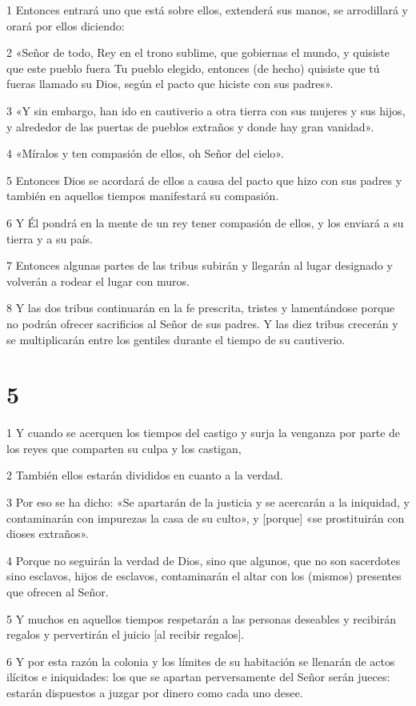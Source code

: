 \par 1 Entonces entrará uno que está sobre ellos, extenderá sus manos, se arrodillará y orará por ellos diciendo:
\par 2 «Señor de todo, Rey en el trono sublime, que gobiernas el mundo, y quisiste que este pueblo fuera Tu pueblo elegido, entonces (de hecho) quisiste que tú fueras llamado su Dios, según el pacto que hiciste con sus padres».
\par 3 «Y sin embargo, han ido en cautiverio a otra tierra con sus mujeres y sus hijos, y alrededor de las puertas de pueblos extraños y donde hay gran vanidad».
\par 4 «Míralos y ten compasión de ellos, oh Señor del cielo».
\par 5 Entonces Dios se acordará de ellos a causa del pacto que hizo con sus padres y también en aquellos tiempos manifestará su compasión.
\par 6 Y Él pondrá en la mente de un rey tener compasión de ellos, y los enviará a su tierra y a su país.
\par 7 Entonces algunas partes de las tribus subirán y llegarán al lugar designado y volverán a rodear el lugar con muros.
\par 8 Y las dos tribus continuarán en la fe prescrita, tristes y lamentándose porque no podrán ofrecer sacrificios al Señor de sus padres. Y las diez tribus crecerán y se multiplicarán entre los gentiles durante el tiempo de su cautiverio.

\chapter{5}

\par 1 Y cuando se acerquen los tiempos del castigo y surja la venganza por parte de los reyes que comparten su culpa y los castigan,
\par 2 También ellos estarán divididos en cuanto a la verdad.
\par 3 Por eso se ha dicho: «Se apartarán de la justicia y se acercarán a la iniquidad, y contaminarán con impurezas la casa de su culto», y [porque] «se prostituirán con dioses extraños».
\par 4 Porque no seguirán la verdad de Dios, sino que algunos, que no son sacerdotes sino esclavos, hijos de esclavos, contaminarán el altar con los (mismos) presentes que ofrecen al Señor.
\par 5 Y muchos en aquellos tiempos respetarán a las personas deseables y recibirán regalos y pervertirán el juicio [al recibir regalos].
\par 6 Y por esta razón la colonia y los límites de su habitación se llenarán de actos ilícitos e iniquidades: los que se apartan perversamente del Señor serán jueces: estarán dispuestos a juzgar por dinero como cada uno desee.

